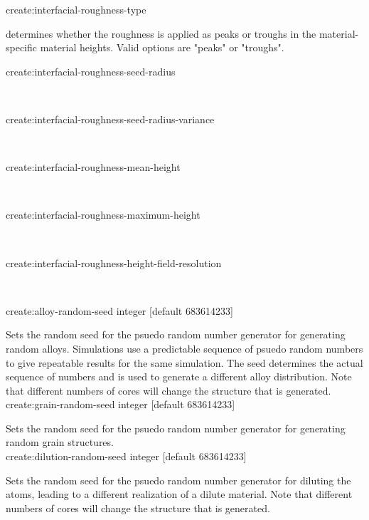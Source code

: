 {\zicf create:interfacial-roughness-type} determines whether the roughness is applied as peaks or troughs in the material-specific material heights. Valid options are "peaks" or "troughs".\\ \par

{\zicf create:interfacial-roughness-seed-radius}\\ \par

{\zicf create:interfacial-roughness-seed-radius-variance}\\ \par

{\zicf create:interfacial-roughness-mean-height}\\ \par

{\zicf create:interfacial-roughness-maximum-height}\\ \par

{\zicf create:interfacial-roughness-height-field-resolution}\\ \par

{\zicf create:alloy-random-seed integer [default 683614233]}
Sets the random seed for the psuedo random number generator for generating random
alloys. Simulations use a predictable sequence of psuedo random numbers to give
repeatable results for the same simulation. The seed determines the actual
sequence of numbers and is used to generate a different alloy distribution.
Note that different numbers of cores will change the structure that is generated.\\

{\zicf create:grain-random-seed integer [default 683614233]}
Sets the random seed for the psuedo random number generator for generating random
grain structures. \\

{\zicf create:dilution-random-seed integer [default 683614233]}
Sets the random seed for the psuedo random number generator for diluting the
atoms, leading to a different realization of a dilute material. Note that
different numbers of cores will change the structure that is generated.\\

